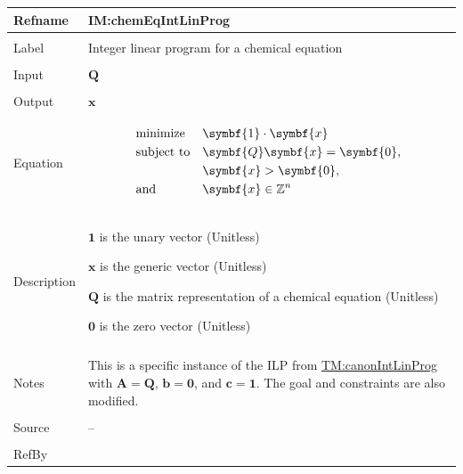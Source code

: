 \documentclass[12pt]{article}
\newcommand{\gt}{\ensuremath >}
\begin{document}
\vspace{\baselineskip}
\noindent
\begin{minipage}{\textwidth}
\begin{tabular}{>{\raggedright}p{}>{\raggedright\arraybackslash}p{}}
\toprule \textbf{Refname} & \textbf{IM:chemEqIntLinProg}
\label{IM:chemEqIntLinProg}
\\ \midrule \\
Label & Integer linear program for a chemical equation
        
\\ \midrule \\
Input & $\symbf{Q}$
        
\\ \midrule \\
Output & $\symbf{x}$
         
\\ \midrule \\
Equation & \begin{displaymath}
           \begin{aligned}
            & \text{minimize} &  & \symbf{1}\cdot{}\symbf{x}\\
            & \text{subject to} &  & \symbf{Q} \symbf{x}=\symbf{0},\\
            & \, &  & \symbf{x}\gt{}\symbf{0},\\
            & \text{and} &  & \symbf{x}\in{}\mathbb{Z}^{n}
           \end{aligned}
           \end{displaymath}
\\ \midrule \\
Description & \begin{symbDescription}
              \item{$\symbf{1}$ is the unary vector (Unitless)}
              \item{$\symbf{x}$ is the generic vector (Unitless)}
              \item{$\symbf{Q}$ is the matrix representation of a chemical equation (Unitless)}
              \item{$\symbf{0}$ is the zero vector (Unitless)}
              \end{symbDescription}
\\ \midrule \\
Notes & This is a specific instance of the ILP from \hyperref[TM:canonIntLinProg]{TM:canonIntLinProg} with $\symbf{A}=\symbf{Q}$, $\symbf{b}=\symbf{0}$, and $\symbf{c}=\symbf{1}$. The goal and constraints are also modified.
        
\\ \midrule \\
Source & --
         
\\ \midrule \\
RefBy & 
\\ \bottomrule
\end{tabular}
\end{minipage}
\end{document}
